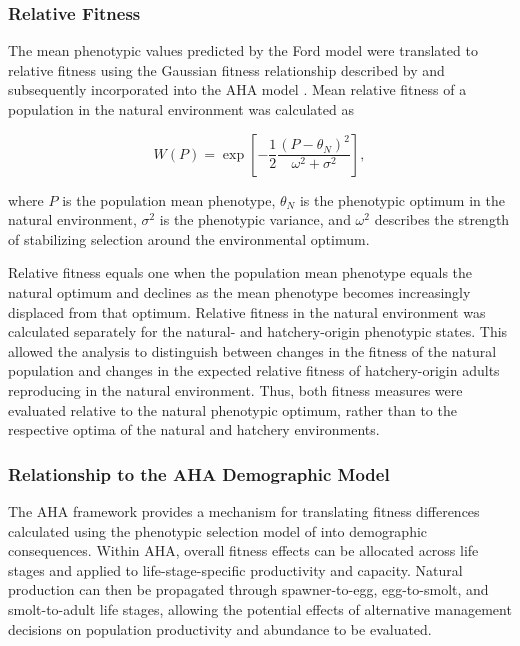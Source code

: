 \documentclass[12pt,letterpaper]{article}
\begin{document}
\subsubsection{Relative Fitness}\label{relative-fitness}

The mean phenotypic values predicted by the Ford model were translated to relative fitness using the Gaussian fitness relationship described by \textcite{ford_selection_2002} and subsequently incorporated into the AHA model \autocite{HSRG2020AHA}. Mean relative fitness of a population in the natural environment was calculated as

\[
W(P) =
\exp\left[
-\frac{1}{2}
\frac{(P-\theta_N)^2}
     {\omega^2+\sigma^2}
\right],
\]

where \(P\) is the population mean phenotype, \(\theta_N\) is the phenotypic optimum in the natural environment, \(\sigma^2\) is the phenotypic variance, and \(\omega^2\) describes the strength of stabilizing selection around the environmental optimum.

Relative fitness equals one when the population mean phenotype equals the natural optimum and declines as the mean phenotype becomes increasingly displaced from that optimum. Relative fitness in the natural environment was calculated separately for the natural- and hatchery-origin phenotypic states. This allowed the analysis to distinguish between changes in the fitness of the natural population and changes in the expected relative fitness of hatchery-origin adults reproducing in the natural environment. Thus, both fitness measures were evaluated relative to the natural phenotypic optimum, rather than to the respective optima of the natural and hatchery environments.

\subsubsection{Relationship to the AHA Demographic Model}\label{relationship-to-the-aha-demographic-model}

The AHA framework provides a mechanism for translating fitness differences calculated using the phenotypic selection model of \textcite{ford_selection_2002} into demographic consequences. Within AHA, overall fitness effects can be allocated across life stages and applied to life-stage-specific productivity and capacity. Natural production can then be propagated through spawner-to-egg, egg-to-smolt, and smolt-to-adult life stages, allowing the potential effects of alternative management decisions on population productivity and abundance to be evaluated.
\end{document}
